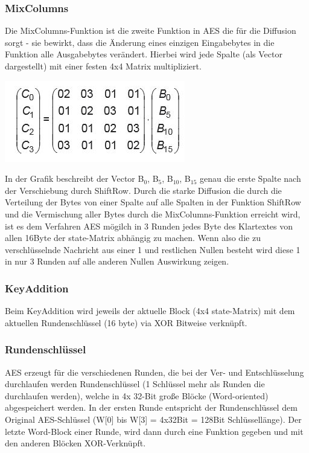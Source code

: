 \documentclass[10pt, a4paper,headsepline]{scrreprt}
\begin{document}
\subsubsection{MixColumns}
Die MixColumns-Funktion ist die zweite Funktion in AES die für die Diffusion sorgt - sie bewirkt, dass die Änderung eines einzigen Eingabebytes in die Funktion alle Ausgabebytes verändert. Hierbei wird jede Spalte (als Vector dargestellt) mit einer festen 4x4 Matrix multipliziert. 

\includegraphics[scale=0.5]{aes_mixcol.JPG}
\hfill

In der Grafik beschreibt der Vector B$_{0}$, B$_{5}$, B$_{10}$, B$_{15}$ genau die erste Spalte nach der Verschiebung durch ShiftRow. 
Durch die starke Diffusion die durch die Verteilung der Bytes von einer Spalte auf alle Spalten in der Funktion ShiftRow und die Vermischung aller Bytes durch die MixColumns-Funktion erreicht wird, ist es dem Verfahren AES mögilch in 3 Runden jedes Byte des Klartextes von allen 16Byte der state-Matrix abhängig zu machen. Wenn also die zu verschlüsselnde Nachricht aus einer 1 und restlichen Nullen besteht wird diese 1 in nur 3 Runden auf alle anderen Nullen Auswirkung zeigen.


\subsubsection{KeyAddition}
Beim KeyAddition wird jeweils der aktuelle Block (4x4 state-Matrix) mit dem aktuellen Rundenschlüssel (16 byte) via XOR Bitweise verknüpft. 

\subsubsection{Rundenschlüssel}
AES erzeugt für die verschiedenen Runden, die bei der Ver- und Entschlüsselung durchlaufen werden Rundenschlüssel (1 Schlüssel mehr als Runden die durchlaufen werden), welche in 4x 32-Bit große Blöcke (Word-oriented) abgespeichert werden. In der ersten Runde entspricht der Rundenschlüssel dem Original AES-Schlüssel (W[0] bis W[3] = 4x32Bit = 128Bit Schlüssellänge). Der letzte Word-Block einer Runde, wird dann durch eine Funktion gegeben und mit den anderen Blöcken XOR-Verknüpft. 
\end{document}
